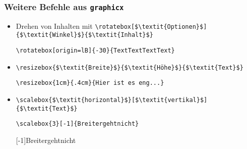 \begin{frame}[fragile]
  \frametitle{Weitere Befehle aus \texttt{graphicx}}

  \onslide<+->

  \begin{itemize}[<+->]
  \item Drehen von Inhalten mit
    \lstinline!\rotatebox[$\textit{Optionen}$]{$\textit{Winkel}$}{$\textit{Inhalt}$}!
    \onslide<+->
\begin{lstlisting}
\rotatebox[origin=lB]{-30}{TextTextTextText}
\end{lstlisting}
  \item \lstinline!\resizebox{$\textit{Breite}$}{$\textit{Höhe}$}{$\textit{Text}$}!
    \onslide<+->
\begin{lstlisting}
\resizebox{1cm}{.4cm}{Hier ist es eng...}
\end{lstlisting}
  \item \lstinline!\scalebox{$\textit{horizontal}$}[$\textit{vertikal}$]{$\textit{Text}$}!
    \onslide<+->
\begin{lstlisting}
\scalebox{3}[-1]{Breitergehtnicht}
\end{lstlisting}
    \scalebox{3}[-1]{Breitergehtnicht}
  \end{itemize}
\end{frame}


